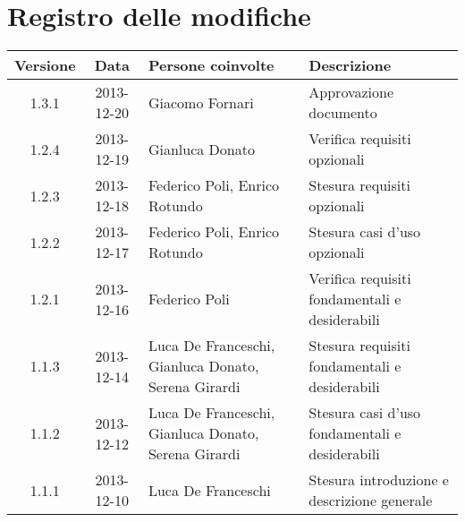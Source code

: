 \section*{Registro delle modifiche}

\small{
\begin{tabularx}{\textwidth}{|c|c|l|X|}
 \hline \textbf{Versione} & \textbf{Data} & \textbf{Persone coinvolte} & \textbf{Descrizione} \\


\hline 1.3.1 & 2013-12-20 & Giacomo Fornari & Approvazione documento \\

\hline 1.2.4 & 2013-12-19 & Gianluca Donato & Verifica requisiti opzionali \\

\hline 1.2.3 & 2013-12-18 & Federico Poli, Enrico Rotundo  & Stesura requisiti opzionali \\ 
 
 \hline 1.2.2 & 2013-12-17 & Federico Poli, Enrico Rotundo & Stesura casi d'uso opzionali \\

 \hline 1.2.1 & 2013-12-16 & Federico Poli & Verifica requisiti fondamentali e desiderabili \\

 \hline 1.1.3 & 2013-12-14 & Luca De Franceschi, Gianluca Donato, Serena Girardi & Stesura requisiti fondamentali e desiderabili \\

 \hline 1.1.2 & 2013-12-12 & Luca De Franceschi, Gianluca Donato, Serena Girardi & Stesura casi d'uso fondamentali e desiderabili \\

 \hline 1.1.1 & 2013-12-10 & Luca De Franceschi & Stesura introduzione e descrizione generale \\

 \hline
\end{tabularx}
}

